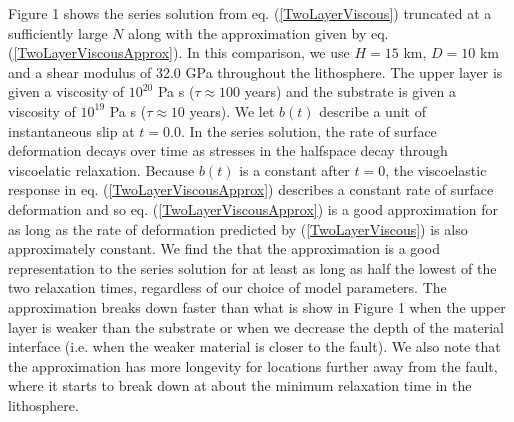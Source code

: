 \documentclass[extra]{gji}
\begin{document}
Figure 1 shows the series solution from eq. (\ref{TwoLayerViscous})
truncated at a sufficiently large $N$ along with the approximation
given by eq. (\ref{TwoLayerViscousApprox}). In this comparison, we use
$H=15$ km, $D=10$ km and a shear modulus of 32.0 GPa throughout the
lithosphere.  The upper layer is given a viscosity of $10^{20}$ Pa s
($\tau\approx 100$ years) and the substrate is given a viscosity of
$10^{19}$ Pa s ($\tau\approx 10$ years).  We let $b(t)$ describe a unit
of instantaneous slip at $t=0.0$.  In the series solution, the rate of
surface deformation decays over time as stresses in the halfspace
decay through viscoelatic relaxation.  Because $b(t)$ is a constant
after $t=0$, the viscoelastic response in
eq. (\ref{TwoLayerViscousApprox}) describes a constant rate of
surface deformation and so eq. (\ref{TwoLayerViscousApprox}) is a good
approximation for as long as the rate of deformation predicted by
(\ref{TwoLayerViscous}) is also approximately constant. We find the
that the approximation is a good representation to the series solution
for at least as long as half the lowest of the two relaxation times,
regardless of our choice of model parameters.  The approximation
breaks down faster than what is show in Figure 1 when the upper layer
is weaker than the substrate or when we decrease the depth of the
material interface (i.e. when the weaker material is closer to the
fault).  We also note that the approximation has more longevity for
locations further away from the fault, where it starts to break down
at about the minimum relaxation time in the lithosphere.
\end{document}
